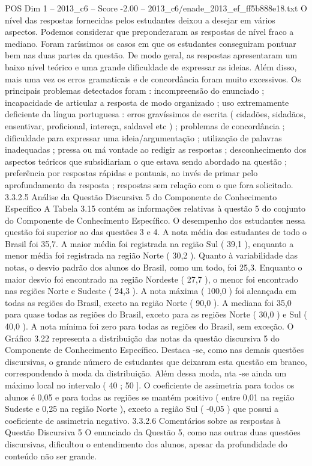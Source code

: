 \begin{textsample}{POS Dim 1 – 2013\_c6 – Score -2.00 – 2013\_c6/enade\_2013\_ef\_ff5b888e18.txt}
O nível das respostas fornecidas pelos estudantes deixou a desejar em vários aspectos.
Podemos considerar que preponderaram as respostas de nível fraco a mediano.
Foram raríssimos os casos em que os estudantes conseguiram pontuar bem nas duas partes da questão.
De modo geral, as respostas apresentaram um baixo nível teórico e uma grande dificuldade de expressar as ideias.
Além disso, mais uma vez os erros gramaticais e de concordância foram muito excessivos.
Os principais problemas detectados foram : incompreensão do enunciado ; incapacidade de articular a resposta de modo organizado ; uso extremamente deficiente da língua portuguesa : erros gravíssimos de escrita ( cidadões, sidadãos, ensentivar, proficional, intereça, saldavel etc ) ; problemas de concordância ; dificuldade para expressar uma ideia/argumentação ; utilização de palavras inadequadas ; pressa ou má vontade ao redigir as respostas ; desconhecimento dos aspectos teóricos que subsidiariam o que estava sendo abordado na questão ; preferência por respostas rápidas e pontuais, ao invés de primar pelo aprofundamento da resposta ; respostas sem relação com o que fora solicitado. 3.3.2.5 Análise da Questão Discursiva 5 do Componente de Conhecimento Específico A Tabela 3.15 contém as informações relativas à questão 5 do conjunto do Componente de Conhecimento Específico.
O desempenho dos estudantes nessa questão foi superior ao das questões 3 e 4.
A nota média dos estudantes de todo o Brasil foi 35,7.
A maior média foi registrada na região Sul ( 39,1 ), enquanto a menor média foi registrada na região Norte ( 30,2 ).
Quanto à variabilidade das notas, o desvio padrão dos alunos do Brasil, como um todo, foi 25,3.
Enquanto o maior desvio foi encontrado na região Nordeste ( 27,7 ), o menor foi encontrado nas regiões Norte e Sudeste ( 24,3 ).
A nota máxima ( 100,0 ) foi alcançada em todas as regiões do Brasil, exceto na região Norte ( 90,0 ).
A mediana foi 35,0 para quase todas as regiões do Brasil, exceto para as regiões Norte ( 30,0 ) e Sul ( 40,0 ).
A nota mínima foi zero para todas as regiões do Brasil, sem exceção.
O Gráfico 3.22 representa a distribuição das notas da questão discursiva 5 do Componente de Conhecimento Específico.
Destaca -se, como nas demais questões discursivas, o grande número de estudantes que deixaram esta questão em branco, correspondendo à moda da distribuição.
Além dessa moda, nta -se ainda um máximo local no intervalo ( 40 ; 50 ].
O coeficiente de assimetria para todos os alunos é 0,05 e para todas as regiões se mantém positivo ( entre 0,01 na região Sudeste e 0,25 na região Norte ), exceto a região Sul ( -0,05 ) que possui a coeficiente de assimetria negativo. 3.3.2.6 Comentários sobre as respostas à Questão Discursiva 5 O enunciado da Questão 5, como nas outras duas questões discursivas, dificultou o entendimento dos alunos, apesar da profundidade do conteúdo não ser grande.

\end{textsample}
